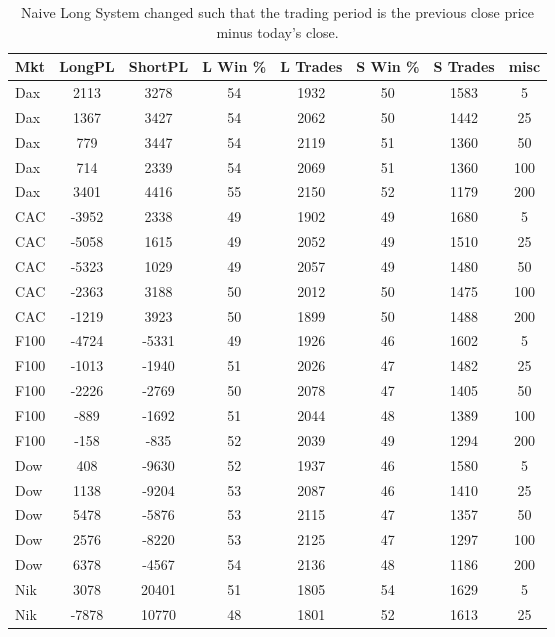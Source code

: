 \begin{table}[ht]
\centering
\caption[Naive Long System - Close to Close]{Naive Long System changed such that the trading period is the previous close price minus today's close.} 
\label{tab:sma_results}
\begin{tabular}{lccccccc}
  \toprule Mkt & LongPL & ShortPL & L Win \% & L Trades & S Win \% & S Trades & misc \\ 
  \midrule Dax & 2113 & 3278 & 54 & 1932 & 50 & 1583 & 5 \\ 
  Dax & 1367 & 3427 & 54 & 2062 & 50 & 1442 & 25 \\ 
  Dax & 779 & 3447 & 54 & 2119 & 51 & 1360 & 50 \\ 
  Dax & 714 & 2339 & 54 & 2069 & 51 & 1360 & 100 \\ 
  Dax & 3401 & 4416 & 55 & 2150 & 52 & 1179 & 200 \\ 
  CAC & -3952 & 2338 & 49 & 1902 & 49 & 1680 & 5 \\ 
  CAC & -5058 & 1615 & 49 & 2052 & 49 & 1510 & 25 \\ 
  CAC & -5323 & 1029 & 49 & 2057 & 49 & 1480 & 50 \\ 
  CAC & -2363 & 3188 & 50 & 2012 & 50 & 1475 & 100 \\ 
  CAC & -1219 & 3923 & 50 & 1899 & 50 & 1488 & 200 \\ 
  F100 & -4724 & -5331 & 49 & 1926 & 46 & 1602 & 5 \\ 
  F100 & -1013 & -1940 & 51 & 2026 & 47 & 1482 & 25 \\ 
  F100 & -2226 & -2769 & 50 & 2078 & 47 & 1405 & 50 \\ 
  F100 & -889 & -1692 & 51 & 2044 & 48 & 1389 & 100 \\ 
  F100 & -158 & -835 & 52 & 2039 & 49 & 1294 & 200 \\ 
  Dow & 408 & -9630 & 52 & 1937 & 46 & 1580 & 5 \\ 
  Dow & 1138 & -9204 & 53 & 2087 & 46 & 1410 & 25 \\ 
  Dow & 5478 & -5876 & 53 & 2115 & 47 & 1357 & 50 \\ 
  Dow & 2576 & -8220 & 53 & 2125 & 47 & 1297 & 100 \\ 
  Dow & 6378 & -4567 & 54 & 2136 & 48 & 1186 & 200 \\ 
  Nik & 3078 & 20401 & 51 & 1805 & 54 & 1629 & 5 \\ 
  Nik & -7878 & 10770 & 48 & 1801 & 52 & 1613 & 25 \\ 

\end{tabular}
\end{table}
